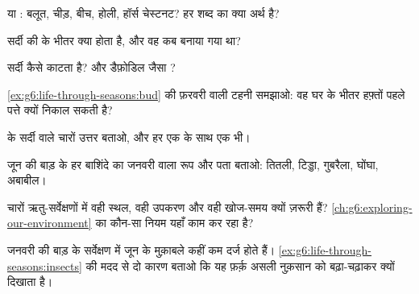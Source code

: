 \begin{exercise}[$\star$]\label{exo:g6:life-through-seasons:2}
 या : बलूत, चीड़, बीच, होली, हॉर्स चेस्टनट? हर शब्द का
क्या अर्थ है?
\end{exercise}

\begin{exercise}[$\star$]\label{exo:g6:life-through-seasons:3}
सर्दी की  के भीतर क्या होता है, और वह कब बनाया गया था?
\end{exercise}

\begin{exercise}[$\star$]\label{exo:g6:life-through-seasons:4}
 सर्दी कैसे काटता है? और डैफ़ोडिल जैसा ?
\end{exercise}

\begin{exercise}[$\star$]\label{exo:g6:life-through-seasons:5}
\cref{ex:g6:life-through-seasons:bud} की फ़रवरी वाली टहनी समझाओ: वह घर
के भीतर हफ़्तों पहले पत्ते क्यों निकाल सकती है?
\end{exercise}

\begin{exercise}[$\star$]\label{exo:g6:life-through-seasons:6}
 के सर्दी वाले चारों उत्तर बताओ, और हर एक के साथ एक  भी।
\end{exercise}

\begin{exercise}[$\star\star$]\label{exo:g6:life-through-seasons:7}
जून की बाड़ के हर बाशिंदे का जनवरी वाला रूप और पता बताओ: तितली, टिड्डा,
गुबरैला, घोंघा, अबाबील।
\end{exercise}

\begin{exercise}[$\star\star$]\label{exo:g6:life-through-seasons:8}
चारों ऋतु-सर्वेक्षणों में वही स्थल, वही उपकरण और वही खोज-समय क्यों
ज़रूरी हैं? \cref{ch:g6:exploring-our-environment} का कौन-सा नियम यहाँ
काम कर रहा है?
\end{exercise}

\begin{exercise}[$\star\star$]\label{exo:g6:life-through-seasons:9}
जनवरी की बाड़ के सर्वेक्षण में जून के मुक़ाबले कहीं कम  दर्ज होते
हैं। \cref{ex:g6:life-through-seasons:insects} की मदद से दो कारण बताओ
कि यह फ़र्क़ असली नुक़सान को बढ़ा-चढ़ाकर क्यों दिखाता है।
\end{exercise}

